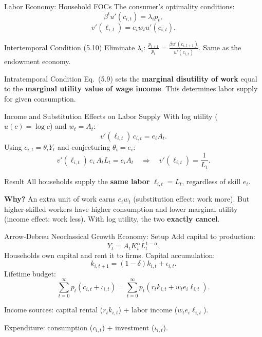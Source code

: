 \documentclass[aspectratio=169,10pt]{beamer}
\newcommand{\apxbutton}[1]{\hfill\hyperlink{#1}{\beamerbutton{Appendix}}}
\begin{document}
\begin{frame}{Labor Economy: Household FOCs}
\hypertarget{m-labor-foc}{}
The consumer's optimality conditions:
\[
\beta^t u'(c_{i,t}) = \lambda_i p_t,
\tag{5.8}
\]
\[
v'(\ell_{i,t}) = e_i w_t u'(c_{i,t}).
\tag{5.9}
\]

\begin{block}{Intertemporal Condition (5.10)}
Eliminate $\lambda_i$: $\displaystyle\frac{p_{t+1}}{p_t} = \frac{\beta u'(c_{i,t+1})}{u'(c_{i,t})}$. Same as the endowment economy.
\end{block}

\begin{block}{Intratemporal Condition}
Eq.\ (5.9) sets the \textbf{marginal disutility of work} equal to the \textbf{marginal utility value of wage income}. This determines labor supply for given consumption.
\end{block}
\apxbutton{a14}
\end{frame}

\begin{frame}{Income and Substitution Effects on Labor Supply}
With log utility ($u(c)=\log c$) and $w_t=A_t$:
\[
v'(\ell_{i,t})\,c_{i,t} = e_i A_t.
\]
Using $c_{i,t} = \theta_i Y_t$ and conjecturing $\theta_i = e_i$:
\[
v'(\ell_{i,t})\, e_i\, A_t L_t = e_i A_t \quad\Rightarrow\quad v'(\ell_{i,t}) = \frac{1}{L_t}.
\]

\begin{block}{Result}
All households supply the \textbf{same labor} $\ell_{i,t}=L_t$, regardless of skill $e_i$.
\end{block}

\medskip
\textbf{Why?} An extra unit of work earns $e_i w_t$ (substitution effect: work more). But higher-skilled workers have higher consumption and lower marginal utility (income effect: work less). With log utility, the two \textbf{exactly cancel}.
\end{frame}


\begin{frame}{Arrow-Debreu Neoclassical Growth Economy: Setup}
Add capital to production:
\[
Y_t=A_t K_t^{\alpha}L_t^{1-\alpha}.
\tag{5.11}
\]
Households own capital and rent it to firms. Capital accumulation:
\[
k_{i,t+1}=(1-\delta)k_{i,t}+\iota_{i,t}.
\tag{5.13}
\]
Lifetime budget:
\[
\sum_{t=0}^{\infty} p_t(c_{i,t}+\iota_{i,t})
=
\sum_{t=0}^{\infty} p_t(r_t k_{i,t}+w_t e_i\ell_{i,t}).
\tag{5.14}
\]

\medskip
Income sources: capital rental ($r_t k_{i,t}$) + labor income ($w_t e_i \ell_{i,t}$).

Expenditure: consumption ($c_{i,t}$) + investment ($\iota_{i,t}$).
\end{frame}
\end{document}
